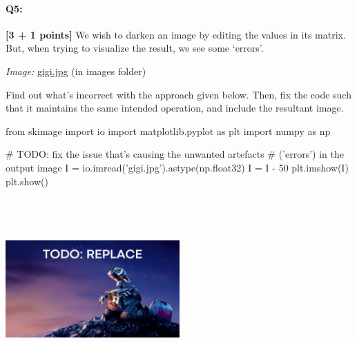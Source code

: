 \documentclass[11pt]{article}
\begin{document}
\begin{enumerate}[(a)]
\begin{enumerate}[(i)]

\end{enumerate}
\end{enumerate}


\pagebreak
    \paragraph{Q5:} \textbf{[3 + 1 points]} We wish to darken an image by editing the values in its matrix. But, when trying to visualize the result, we see some `errors'.

\emph{Image:} \href{images/gigi.jpg}{gigi.jpg} (in images folder)

\begin{tcolorbox}[colback=orange!5!white,colframe=orange!75!black]
Find out what's incorrect with the approach given below. Then, fix the code such that it maintains the same intended operation, and include the resultant image.
\end{tcolorbox}

\begin{tcolorbox}[colback=white!5!white,colframe=green!75!black,height fill]
    \begin{python}
    from skimage import io
    import matplotlib.pyplot as plt
    import numpy as np
    
    # TODO: fix the issue that's causing the unwanted artefacts
    # ('errors') in the output image
    I = io.imread('gigi.jpg').astype(np.float32)
    I = I - 50
    plt.imshow(I)
    plt.show()
    \end{python}
    
    \includegraphics[width=0.5\textwidth,height=7cm,keepaspectratio]{images/TODO wall-e.jpg}

\end{tcolorbox}
\end{document}

